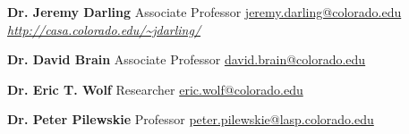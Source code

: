 \documentclass[11pt]{article} %
\begin{document}
\begin{paracol}{2}
\begin{minipage}{\textwidth}
    \position{}{}
    {\textbf{Dr. Jeremy Darling}}
    {{Associate Professor}}
    {\href{mailto:jeremy.darling@colorado.edu}{jeremy.darling@colorado.edu}}
    {\href{http://casa.colorado.edu/~jdarling/}{\textit{http://casa.colorado.edu/\textasciitilde jdarling/}}}
    \vspace{3ex}
\end{minipage}

\begin{minipage}{\textwidth}
    \position{}{}
    {\textbf{Dr. David Brain}}
    {Associate Professor}
    {\href{mailto:david.brain@colorado.edu}{david.brain@colorado.edu}}
    \vspace{3ex}
\end{minipage}
\switchcolumn
\begin{minipage}{\textwidth}
    \position{}{}
    {\textbf{Dr. Eric T. Wolf}}
    {Researcher}
    {\href{mailto:eric.wolf@colorado.edu}{eric.wolf@colorado.edu}}
    \vspace{3ex}
\end{minipage}
\begin{minipage}{\textwidth}
    \position{}{}
    {\textbf{Dr. Peter Pilewskie}}
    {Professor}
    {\href{mailto:peter.pilewskie@lasp.colorado.edu}
    {peter.pilewskie@lasp.colorado.edu}}
    \vspace{3ex}
\end{minipage}

\end{paracol}
\end{document}
